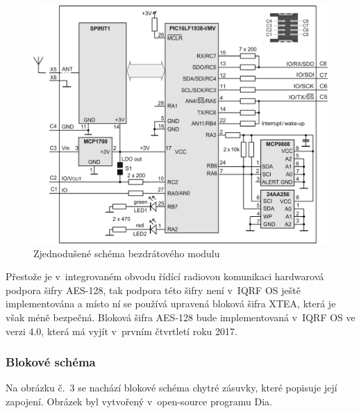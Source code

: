 \documentclass[12pt,a4paper,oneside]{article}
\begin{document}
\begin{figure}[H]
\centering
\label{fig:iqrf/zjednodusene-schema}
\includegraphics[width = 128mm]{../img/iqrf/dctr-72dat-zjednodusene-schema.png}
\caption{Zjednodušené schéma bezdrátového modulu}
\end{figure}

Přestože je v~integrovaném obvodu řídící radiovou komunikaci hardwarová podpora šifry AES-128, tak podpora této šifry není v~IQRF OS ještě implementována a místo ní se používá upravená bloková šifra XTEA, která je však méně bezpečná. Bloková šifra AES-128 bude implementovaná v~IQRF OS ve verzi 4.0, která má vyjít v~prvním čtvrtletí roku 2017.

\newpage

\subsubsection{Blokové schéma}

Na obrázku č.~3 se nachází blokové schéma chytré zásuvky, které popisuje její zapojení. Obrázek byl vytvořený v~open-source programu Dia\cite{sw/dia}.
\end{document}
